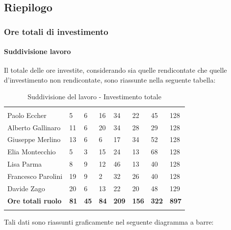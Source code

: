 	\subsection{Riepilogo}
		\subsubsection{Ore totali di investimento}
			\paragraph{Suddivisione lavoro} \Spazio
			Il totale delle ore investite, considerando sia quelle rendicontate che quelle d'investimento non rendicontate, sono riassunte nella seguente tabella:
					\begin{table}[H]
			\centering
			\begin{tabular}{|C{4cm}|C{0.8cm}|C{0.8cm}|C{0.8cm}|C{0.8cm}|C{0.8cm}|C{0.8cm}|C{3cm}|}
				 & & &&&&&\\
				Paolo Eccher 		& 5 & 6 & 16 & 34 & 22 & 45 & 128
				 \\
				\hline
				Alberto Gallinaro 	& 11 & 6 & 20 & 34 & 28 & 29 & 128 \\
				\hline
				Giuseppe Merlino 	& 13 & 6 & 6  & 17 & 34 & 52 & 128 \\
				\hline
				Elia Montecchio 	& 5 & 3 & 15 & 24 & 13 & 68 & 128 \\
				\hline
				Lisa Parma 			& 8 & 9 & 12 & 46 & 13 & 40 & 128 \\
				\hline
				Francesco Parolini 	& 19 & 9 & 2 & 32 & 26 & 40 & 128 \\
				\hline
				Davide Zago 		& 20 & 6 & 13 & 22 & 20 & 48 & 129 \\
				\hline
				\textbf{Ore totali ruolo}  & \textbf{81} & \textbf{45} & \textbf{84} & \textbf{209} & \textbf{156} & \textbf{322} & \textbf{897} \\
			\end{tabular}
			\caption{Suddivisione del lavoro - Investimento totale }
			\end{table}
		
			Tali dati sono riassunti graficamente nel seguente diagramma a barre:
			
